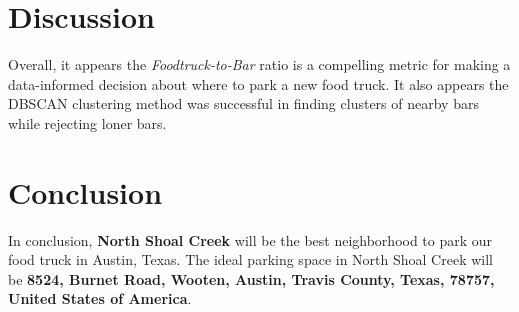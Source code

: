 \documentclass{deagle}
\begin{document}
\section*{Discussion}

Overall, it appears the \emph{Foodtruck-to-Bar} ratio is a compelling metric for making a data-informed decision about where to park a new food truck. It also appears the DBSCAN clustering method was successful in finding clusters of nearby bars while rejecting loner bars.

\section*{Conclusion}

In conclusion, \textbf{North Shoal Creek} will be the best neighborhood to park our food truck in Austin, Texas. The ideal parking space in North Shoal Creek will be \textbf{8524, Burnet Road, Wooten, Austin, Travis County, Texas, 78757, United States of America}.
\end{document}
